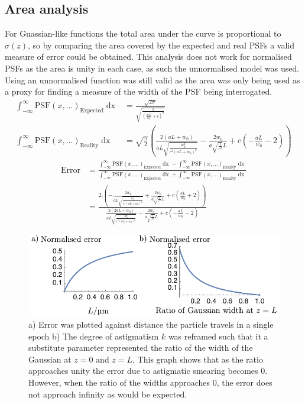 \subsection{Area analysis}

For Guassian-like functions the total area under the curve is proportional to $\sigma(z)$, so by comparing the area covered by the expected and real PSFs a valid measure of error could be obtained.
This analysis does not work for normalised PSFs as the area is unity in each case, as such the unnormalised model was used.
Using an unnormalised function was still valid as the area was only being used as a proxy for finding a measure of the width of the PSF being interrogated.
\begin{align*}
  \int_{-\infty}^{\infty} \text{PSF}(x,...)_{\text{Expected}} \mathop{dx} &= \frac{\sqrt{2 \pi }}{\sqrt{\frac{1}{\left(\frac{a c L}{w_0}+c\right)^2}}}\\
  \int_{-\infty}^{\infty} \text{PSF}(x,...)_{\text{Reality}} \mathop{dx} &=\sqrt{\frac{\pi }{2}} \left(\frac{2 (a L+w_0)}{a L \sqrt{\frac{w_0^2}{c^2 (a L+w_0)^2}}}-\frac{2 w_0}{a \sqrt{\frac{1}{c^2}} L}+c \left(-\frac{a L}{w_0}-2\right)\right)
\end{align*}
\begin{align*}
  \text{Error} &= \frac{\int_{-\infty}^{\infty} \text{PSF}(x,...)_{\text{Expected}} \mathop{dx} - \int_{-\infty}^{\infty} \text{PSF}(x,...)_{\text{Reality}}\mathop{dx}}
  {\int_{-\infty}^{\infty} \text{PSF}(x,...)_{\text{Expected}} \mathop{dx} + \int_{-\infty}^{\infty} \text{PSF}(x,...)_{\text{Reality}}\mathop{dx}} \\
  &= \frac{2. \left(-\frac{2 w_0}{a L \sqrt{\frac{w_0^2}{c^2 (a L+w_0)^2}}}+\frac{2 w_0}{a \sqrt{\frac{1}{c^2}} L}+c \left(\frac{a L}{w_0}+2\right)\right)}{\frac{2 (2 a L+w_0)}{a L \sqrt{\frac{w_0^2}{c^2 (a L+w_0)^2}}}-\frac{2 w_0}{a \sqrt{\frac{1}{c^2}} L}+c \left(-\frac{a L}{w_0}-2\right)}
\end{align*}

\begin{figure}
  \centering
  \includegraphics{./mathematica/area_analysis}
  \caption{
  a) Error was plotted against distance the particle travels in a single epoch%
  b) The degree of astigmatism $k$ was reframed such that it a substitute parameter represented the ratio of the width of the Gaussian at $z=0$ and $z=L$.
  This graph shows that as the ratio approaches unity the error due to astigmatic smearing becomes $0$.
  However, when the ratio of the widths approaches 0, the error does not approach infinity as would be expected.
  }
  \label{fig:area_analysis}
\end{figure}

